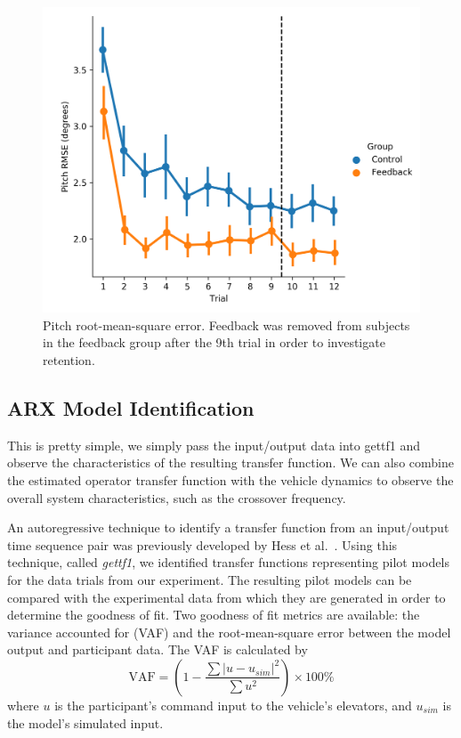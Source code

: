 \begin{figure}[t]
    \centering
    \includegraphics[width=0.8\linewidth]{figures/Modeling/prms_arx.png}
    \caption[Pitch root-mean-square error]{Pitch root-mean-square error. Feedback was removed from subjects in the feedback group after the 9th trial in order to investigate retention.}
    \label{fig:prmse}
\end{figure}

\subsection{ARX Model Identification}
This is pretty simple, we simply pass the input/output data into gettf1 and observe the characteristics of the resulting transfer function.
We can also combine the estimated operator transfer function with the vehicle dynamics to observe the overall system characteristics, such as the crossover frequency.

An autoregressive technique to identify a transfer function from an input/output time sequence pair was previously developed by Hess et al.~\cite{hess_modeling_2002}.
Using this technique, called \textit{gettf1}, we identified transfer functions representing pilot models for the data trials from our experiment.
The resulting pilot models can be compared with the experimental data from which they are generated in order to determine the goodness of fit.
Two goodness of fit metrics are available: the variance accounted for (VAF) and the root-mean-square error between the model output and participant data.
The VAF is calculated by
\begin{equation}
    \mbox{VAF} = \left( 1 - \dfrac{\sum{|u - u_{sim}|^2}} {\sum{u^2}} \right) \times \mbox{100\%}
\end{equation}
where $u$ is the participant's command input to the vehicle's elevators, and $u_{sim}$ is the model's simulated input.

